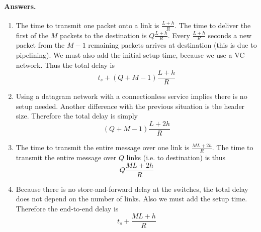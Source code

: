 \paragraph{Answers.}

\begin{enumerate}

  \item The time to transmit one packet onto a link is \(\frac{L +
    h}{R}\). The time to deliver the first of the \(M\) packets to the
    destination is \(Q{\frac{L+h}{R}}\). Every \(\frac{L+h}{R}\)
    seconds a new packet from the \(M-1\) remaining packets arrives at
    destination (this is due to pipelining). We must also add the
    initial setup time, because we use a VC network. Thus the total
    delay is
    \[
      t_{s} + (Q + M - 1){\frac{L+h}{R}}
    \]

  \item Using a datagram network with a connectionless service implies
    there is no setup needed. Another difference with the previous
    situation is the header size. Therefore the total delay is simply
    \[
     (Q + M - 1){\frac{L + 2h}{R}}
    \]

  \item The time to transmit the entire message over one link is
    \(\frac{ML + 2h}{R}\). The time to transmit the entire message over
    \(Q\) links (i.e. to destination) is thus
    \[
      Q{\frac{ML + 2h}{R}}
    \]
 
  \item Because there is no store-and-forward delay at the switches,
    the total delay does not depend on the number of links. Also we
    must add the setup time. Therefore the end-to-end delay is
    \[
      t_{s} + \frac{ML + h}{R}
    \]

\end{enumerate}
